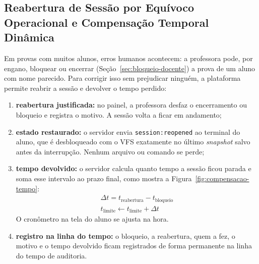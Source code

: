 \subsection{Reabertura de Sessão por Equívoco Operacional e Compensação Temporal Dinâmica}
\label{sec:reabertura-sessao}

Em provas com muitos alunos, erros humanos acontecem: a professora pode, por engano, bloquear ou encerrar (Seção~\ref{sec:bloqueio-docente}) a prova de um aluno com nome parecido. Para corrigir isso sem prejudicar ninguém, a plataforma permite reabrir a sessão e devolver o tempo perdido:

\begin{enumerate}
    \item \textbf{reabertura justificada:} no painel, a professora desfaz o encerramento ou bloqueio e registra o motivo. A sessão volta a ficar em andamento;
    \item \textbf{estado restaurado:} o servidor envia \texttt{session:reopened} ao terminal do aluno, que é desbloqueado com o VFS exatamente no último \textit{snapshot} salvo antes da interrupção. Nenhum arquivo ou comando se perde;
    \item \textbf{tempo devolvido:} o servidor calcula quanto tempo a sessão ficou parada e soma esse intervalo ao prazo final, como mostra a Figura~\ref{fig:compensacao-tempo}:
    \begin{gather}
        \Delta t = t_{\text{reabertura}} - t_{\text{bloqueio}} \label{eq:delta-t}\\
        t_{\text{limite}} \leftarrow t_{\text{limite}} + \Delta t \label{eq:novo-limite}
    \end{gather}
    O cronômetro na tela do aluno se ajusta na hora.
    \item \textbf{registro na linha do tempo:} o bloqueio, a reabertura, quem a fez, o motivo e o tempo devolvido ficam registrados de forma permanente na linha do tempo de auditoria.
\end{enumerate}


